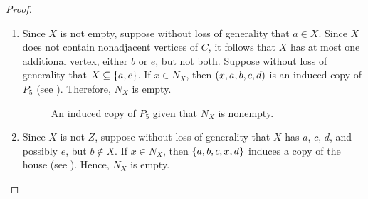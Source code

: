\begin{proof}
    \leavevmode \par
    \begin{enumerate}[label=(\roman*)]
        \item Since $X$ is not empty, suppose without loss of generality that
            $a\in X$. Since $X$ does not contain nonadjacent vertices of $C$, it
            follows that $X$ has at most one additional vertex, either $b$ or
            $e$, but not both. Suppose without loss of generality that
            $X\subseteq \left\{a,e\right\}$. If $x\in N_X$, then $\left(x,a,b,c,d\right)$ is an
            induced copy of $P_5$ (see ). Therefore, $N_X$ is
            empty.

            \begin{figure}[htb!]
                \centering
                \caption{An induced copy of $P_5$ given that $N_X$ is nonempty.}
                \label{fig:pre_1}
            \end{figure}

        \item Since $X$ is not $Z$, suppose without loss of generality that $X$
            has $a$, $c$, $d$, and possibly $e$, but $b\notin X$. If $x\in N_X$,
            then $\left\{a,b,c,x,d\right\}$ induces a copy of the house (see
            ). Hence, $N_X$ is empty.

            \begin{figure}[htb!]
                \centering
\end{figure}
\end{enumerate}
\end{proof}
